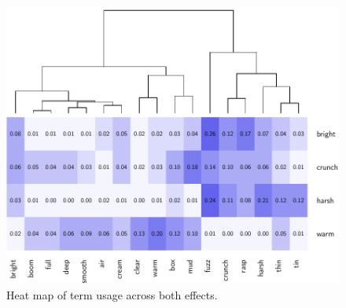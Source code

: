 		\begin{figure}[h!]
			\centering
			\includegraphics{chapter7/Images/CombinedConfusion.pdf}
			\caption{Heat map of term usage across both effects.}
		\end{figure}

